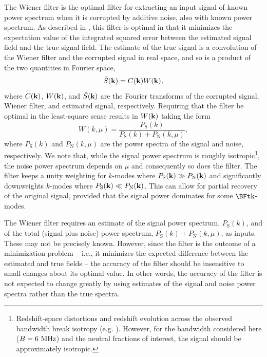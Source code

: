The Wiener filter is the optimal filter for extracting
an input signal of known power spectrum when it is corrupted by additive noise,
also with known power spectrum. 
As described in \cite{NRecipes},
this filter is optimal in that it minimizes the expectation value of the integrated squared
error between the estimated signal field and the true signal
field. The estimate of the true signal is a convolution of the Wiener
filter and the corrupted signal in real space, and so is a product of
the two quantities in Fourier space,
\begin{equation}
\tilde{S}({\bf k}) = C({\bf k})W({\bf
  k}), \label{eq:FourierConvolution}
\end{equation}
where $C({\bf k})$, $W({\bf k})$, and $\tilde{S}({\bf k})$ are the
Fourier transforms of the corrupted signal, Wiener filter, and
estimated signal, respectively. Requiring that the filter be optimal
in the least-square sense results in $W({\bf k})$ taking the form
\begin{equation}  W(k,\mu) = \frac{P_{\text{S}}(k)}{P_{\text{S}}(k) + P_{\text{N}}(k,\mu)}, \label{eq:WienerFilter} \end{equation}
where $P_{\text{S}}(k)$ and $P_{\text{N}}(k,\mu)$ are the power
spectra of the signal and noise, respectively. We note that, while the
signal power spectrum is roughly isotropic\footnote{Redshift-space distortions
and redshift evolution across the observed bandwidth break isotropy (e.g. \citealt{Datta:2011hv}). However,
for the bandwidth considered here ($B = 6 \ \text{MHz}$) and the neutral fractions of interest, the
signal should be approximately isotropic.}, the noise power spectrum depends on $\mu$ and
consequently so does the filter. The filter keeps a unity weighting
for $k$-modes where $P_{\text{S}}({\bf k}) \gg P_{\text{N}}({\bf k})$
and significantly downweights $k$-modes where $P_{\text{S}}({\bf k})
\ll P_{\text{N}}({\bf k})$. This can allow for partial recovery of
the original signal, provided that the signal power dominates for some
$\k$-modes.

The Wiener filter requires an estimate of the signal power spectrum, $P_{\text{S}}(k)$, and of
the total (signal plus noise) power spectrum, $P_{\text{S}}(k) + P_{\text{N}}(k, \mu)$, as inputs. These
may not be precisely known. However, since the filter is the outcome of a
minimization problem -- i.e., it minimizes the expected difference
between the estimated and true fields -- the accuracy of the filter
should be insensitive to small changes about its optimal value. In
other words, the accuracy of the filter is not expected to
change greatly by using estimates of the signal and noise power spectra rather than
the true spectra. 

